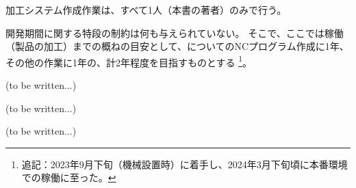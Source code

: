 




加工システム作成作業は、すべて1人（本書の著者）のみで行う。



開発期間に関する特段の制約は何も与えられていない。
そこで、ここでは稼働（製品の加工）までの概ねの目安として、\Dimple についてのNCプログラム作成に1年、その他の作業に1年の、計2年程度を目指すものとする
\footnote{追記：2023年9月下旬（機械設置時）に着手し、2024年3月下旬頃に本番環境での稼働に至った。}。




(to be written...)




(to be written...)




(to be written...)


